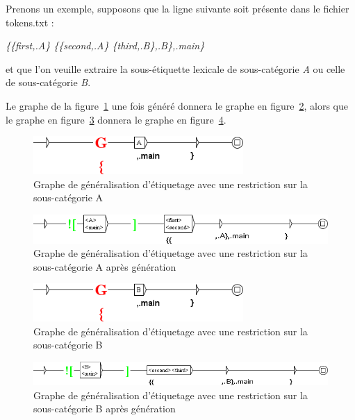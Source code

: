 \bigskip
Prenons un exemple, supposons que la ligne suivante soit présente dans le fichier tokens.txt :


\emph{\{\{first,.A\} \{\{second,.A\} \{third,.B\},.B\},.main\}}

et que l'on veuille extraire la sous-étiquette lexicale de sous-catégorie \textit{A} ou celle de sous-catégorie \textit{B}.

\bigskip
Le graphe de la figure~\ref{fig:graphe_restriction_A} une fois généré donnera le graphe en figure~\ref{fig:graphe_restriction_A_genere}, alors que le graphe en figure~\ref{fig:graphe_restriction_B} donnera le graphe en figure~\ref{fig:graphe_restriction_B_genere}.

\begin{figure}[!htb]
  \centering
  \includegraphics[width=8cm]{resources/img/graphe_restriction_A.png}
  \caption{Graphe de généralisation d'étiquetage avec une restriction sur la sous-catégorie A}
  \label{fig:graphe_restriction_A}
\end{figure}

\begin{figure}[!htb]
  \centering
  \includegraphics[width=14cm]{resources/img/graphe_restriction_A_genere.png}
  \caption{Graphe de généralisation d'étiquetage avec une restriction sur la sous-catégorie A après génération}
  \label{fig:graphe_restriction_A_genere}
\end{figure}

\begin{figure}[!htb]
  \centering
  \includegraphics[width=8cm]{resources/img/graphe_restriction_B.png}
  \caption{Graphe de généralisation d'étiquetage avec une restriction sur la sous-catégorie B}
  \label{fig:graphe_restriction_B}
\end{figure}

\begin{figure}[!htb]
  \centering
  \includegraphics[width=14cm]{resources/img/graphe_restriction_B_genere.png}
  \caption{Graphe de généralisation d'étiquetage avec une restriction sur la sous-catégorie B après génération}
  \label{fig:graphe_restriction_B_genere}
\end{figure}

